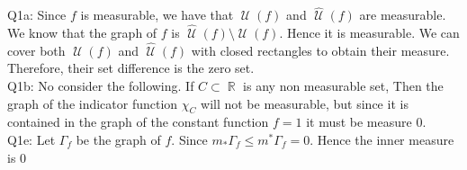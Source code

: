 \documentclass[letterpaper]{article}
\DeclareMathOperator{\U}{\mathcal{U}}
\DeclareMathOperator{\R}{\mathbb{R}}
\begin{document}
\noindent Q1a: Since $f$ is measurable, we have that $\U(f)$ and $\hat{\U}(f)$ are measurable. We know that the graph of $f$ is $\hat{\U}(f)\setminus \U(f)$. Hence it is measurable. We can cover both $\U(f)$ and $\hat{\U}(f)$ with closed rectangles to obtain their measure. Therefore, their set difference is the zero set. 
\newline \\ Q1b: No consider the following. If $C\subset \R$ is any non measurable set, Then the graph of the indicator function $\chi_C$ will not be measurable, but since it is contained in the graph of the constant function $f=1$ it must be measure 0. 
\newline \\ Q1e: Let $\Gamma_f$ be the graph of $f$. Since $m_{\ast} \Gamma_f \leq m^\ast{\Gamma_f}=0$. Hence the inner measure is 0 
\end{document}

